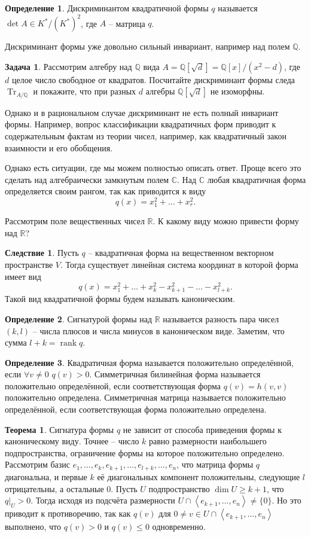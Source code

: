 \documentclass[10pt,a4paper,oneside]{book} %
\theoremstyle{definition}
\newtheorem{zad}{Задача}
\newtheorem*{defn}{Определение}
\newtheorem{thm}{Теорема}
\newtheorem{cor}{Следствие}
\newcommand{\mb}[1]{\mathbb{#1}}
\newcommand{\rank}{\operatorname{rank}}
\newcommand{\tr}{\operatorname{Tr}}
\def\lan{\left\langle }
\def\ran{\right\rangle}
\def\thrm{\begin{thm}}
\def\ethrm{\end{thm}}
\def\dfn{\begin{defn}}
\def\edfn{\end{defn}}
\def\zd{\begin{zad}}
\def\ezd{\end{zad}}
\def\crl{\begin{cor}}
\def\ecrl{\end{cor}}
\begin{document}
\dfn Дискриминантом квадратичной формы $q$ называется $\det A \in K^*/(K^*)^2$, где $A$ -- матрица $q$.
\edfn

Дискриминант формы уже довольно сильный инвариант, например над полем $\mb Q$.

\zd Рассмотрим алгебру над $\mb Q$ вида $A=\mb Q[\sqrt{d}]= \mb Q[x]/(x^2-d)$, где $d$ целое число свободное от квадратов. Посчитайте дискриминант формы следа $\tr_{A/\mb Q}$ и покажите, что при разных $d$ алгебры $\mb Q[\sqrt{d}]$ не изоморфны.
\ezd

Однако и в рациональном случае дискриминант не есть полный инвариант формы. Например, вопрос классификации квадратичных форм приводит к содержательным фактам из теории чисел, например, как квадратичный закон взаимности и его обобщения.

Однако есть ситуации, где мы можем полностью описать ответ.
Проще всего это сделать над алгебраически замкнутым полем $\mb C$. Над $\mb C$ любая квадратичная форма определяется своим рангом, так как приводится к виду $$q(x)=x_1^2+\dots+x_r^2.$$


Рассмотрим поле вещественных чисел $\mb R$. К какому виду можно привести форму над $\mb R$? 

\crl Пусть $q$ -- квадратичная форма на вещественном векторном пространстве $V$. Тогда существует линейная система координат в которой форма имеет вид $$q(x)= x_1^2+\dots + x_k^2 - x_{k+1}^2-\dots-x_{l+k}^2.$$
Такой вид квадратичной формы будем называть каноническим. 
\ecrl

\dfn Сигнатурой формы над $\mb R$ называется разность пара чисел $(k, l)$ -- числа плюсов и числа минусов в каноническом виде. Заметим, что сумма $l+k= \rank q$.
\edfn

\dfn Квадратичная форма называется положительно определённой, если $\forall v\neq 0$ $q(v)>0$. Симметричная билинейная форма называется положительно определённой, если соответствующая форма $q(v)=h(v,v)$ положительно определена. Симметричная матрица называется положительно определённой, если соответствующая форма положительно определена.
\edfn



\thrm Сигнатура формы $q$ не зависит от способа приведения формы к каноническому виду. Точнее -- число $k$ равно размерности наибольшего подпространства, ограничение формы  на которое положительно определено.
\proof Рассмотрим базис $e_1,\dots,e_k,e_{k+1},\dots,e_{l+k}, \dots, e_n$, что матрица формы $q$ диагональна, и первые $k$ её диагональных компонент положительны, следующие $l$ отрицательны, а остальные 0. 
Пусть $U$ подпространство $\dim U \geq k+1$, что $q|_{U}>0$. Тогда исходя из подсчёта размерности $U\cap \lan e_{k+1},\dots,e_n\ran \neq \{0\}$. Но это приводит к противоречию, так как $q(v)$ для $0\neq v \in U\cap \lan e_{k+1},\dots,e_n\ran $ выполнено, что $q(v)>0$ и $q(v)\leq 0$ одновременно.
\endproof
\ethrm
\end{document}
